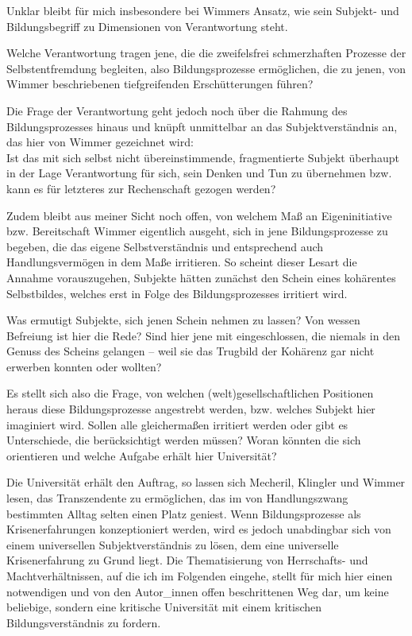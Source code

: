 Unklar bleibt für mich insbesondere bei Wimmers Ansatz, wie sein
Subjekt- und Bildungsbegriff zu Dimensionen von Verantwortung steht.

Welche
Verantwortung tragen jene, die die zweifelsfrei schmerzhaften Prozesse der
Selbstentfremdung begleiten, also Bildungsprozesse ermöglichen, die zu jenen,
von Wimmer beschriebenen tiefgreifenden Erschütterungen führen?

Die Frage der
Verantwortung geht jedoch noch über die Rahmung des Bildungsprozesses hinaus
und knüpft unmittelbar an das Subjektverständnis an, das hier von Wimmer
gezeichnet wird:\\
Ist das mit sich selbst nicht übereinstimmende, fragmentierte
Subjekt überhaupt in der Lage Verantwortung für sich, sein Denken und Tun zu
übernehmen bzw. kann es für letzteres zur Rechenschaft gezogen werden?

Zudem
bleibt aus meiner Sicht noch offen, von welchem Maß an Eigeninitiative bzw.
Bereitschaft Wimmer eigentlich ausgeht, sich in jene Bildungsprozesse zu
begeben, die das eigene Selbstverständnis und entsprechend auch
Handlungsvermögen in dem Maße irritieren. So scheint dieser Lesart die Annahme
vorauszugehen, Subjekte hätten zunächst den Schein eines kohärentes
Selbstbildes, welches erst in Folge des Bildungsprozesses irritiert wird.

Was
ermutigt Subjekte, sich jenen Schein nehmen zu lassen? Von wessen Befreiung ist
hier die Rede? Sind hier jene mit eingeschlossen, die niemals in den Genuss des
Scheins gelangen – weil sie das Trugbild der Kohärenz gar nicht erwerben
konnten oder wollten?

Es stellt sich also die Frage, von welchen
(welt)gesellschaftlichen Positionen heraus diese Bildungsprozesse angestrebt
werden, bzw. welches Subjekt hier imaginiert wird. Sollen alle gleichermaßen
irritiert werden oder gibt es Unterschiede, die berücksichtigt werden müssen?
Woran könnten die sich orientieren und welche Aufgabe erhält hier Universität?

Die Universität erhält den Auftrag, so lassen sich Mecheril, Klingler und
Wimmer lesen, das Transzendente zu ermöglichen, das im von Handlungszwang
bestimmten Alltag selten einen Platz geniest. Wenn Bildungsprozesse als
Krisenerfahrungen konzeptioniert werden, wird es jedoch unabdingbar sich von
einem universellen Subjektverständnis zu lösen, dem eine universelle
Krisenerfahrung zu Grund liegt. Die Thematisierung von Herrschafts- und
Machtverhältnissen, auf die ich im Folgenden eingehe, stellt für mich hier
einen notwendigen und von den Autor\_innen offen beschrittenen Weg dar, um
keine beliebige, sondern eine kritische Universität mit einem kritischen
Bildungsverständnis zu fordern.

